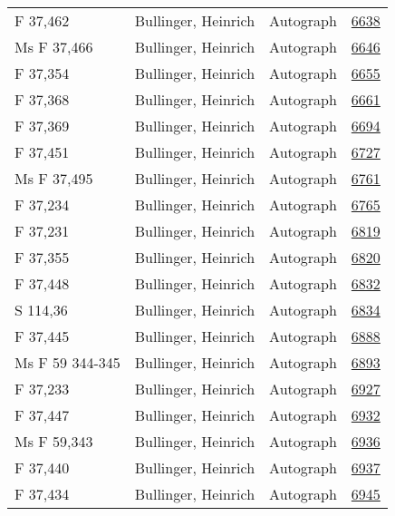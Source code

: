 \documentclass[10pt,a4paper,landscape]{report}
\begin{document}
\begin{longtable}{p{16cm}p{4cm}lr}
F 37,462	&	Bullinger, Heinrich	&	Autograph	&	\href{http://130.60.24.72/assignment/6638}{6638}\\
Ms F 37,466	&	Bullinger, Heinrich	&	Autograph	&	\href{http://130.60.24.72/assignment/6646}{6646}\\
F 37,354	&	Bullinger, Heinrich	&	Autograph	&	\href{http://130.60.24.72/assignment/6655}{6655}\\
F 37,368	&	Bullinger, Heinrich	&	Autograph	&	\href{http://130.60.24.72/assignment/6661}{6661}\\
F 37,369	&	Bullinger, Heinrich	&	Autograph	&	\href{http://130.60.24.72/assignment/6694}{6694}\\
F 37,451	&	Bullinger, Heinrich	&	Autograph	&	\href{http://130.60.24.72/assignment/6727}{6727}\\
Ms F 37,495	&	Bullinger, Heinrich	&	Autograph	&	\href{http://130.60.24.72/assignment/6761}{6761}\\
F 37,234	&	Bullinger, Heinrich	&	Autograph	&	\href{http://130.60.24.72/assignment/6765}{6765}\\
F 37,231	&	Bullinger, Heinrich	&	Autograph	&	\href{http://130.60.24.72/assignment/6819}{6819}\\
F 37,355	&	Bullinger, Heinrich	&	Autograph	&	\href{http://130.60.24.72/assignment/6820}{6820}\\
F 37,448	&	Bullinger, Heinrich	&	Autograph	&	\href{http://130.60.24.72/assignment/6832}{6832}\\
S 114,36	&	Bullinger, Heinrich	&	Autograph	&	\href{http://130.60.24.72/assignment/6834}{6834}\\
F 37,445	&	Bullinger, Heinrich	&	Autograph	&	\href{http://130.60.24.72/assignment/6888}{6888}\\
Ms F 59 344-345	&	Bullinger, Heinrich	&	Autograph	&	\href{http://130.60.24.72/assignment/6893}{6893}\\
F 37,233	&	Bullinger, Heinrich	&	Autograph	&	\href{http://130.60.24.72/assignment/6927}{6927}\\
F 37,447	&	Bullinger, Heinrich	&	Autograph	&	\href{http://130.60.24.72/assignment/6932}{6932}\\
Ms F 59,343	&	Bullinger, Heinrich	&	Autograph	&	\href{http://130.60.24.72/assignment/6936}{6936}\\
F 37,440	&	Bullinger, Heinrich	&	Autograph	&	\href{http://130.60.24.72/assignment/6937}{6937}\\
F 37,434	&	Bullinger, Heinrich	&	Autograph	&	\href{http://130.60.24.72/assignment/6945}{6945}\\

\end{longtable}
\end{document}
